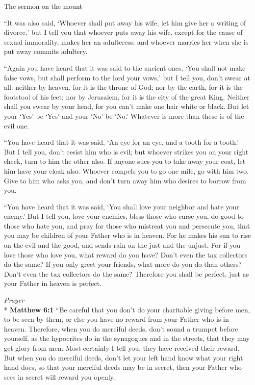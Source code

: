 \documentclass[10pt,a5paper,twoside]{article}
\newcommand{\quotesize}{\normalsize{}}
\newenvironment{quotetext}{\begingroup\quotesize}{\endgroup}
\newcommand{\intex}[1]{\index[texts]{#1}}
\newcommand{\bible}[2]{\begin{quotetext}\textbf{#1}\intex{#1} #2\end{quotetext}}
\newcommand{\matthew}[2]{\bible{Matthew #1}{#2}}
\newcommand{\subhead}[1]{\emph{#1}\\*}
\begin{document}
\begin{section}{The sermon on the mount}
{   ``It was also said, `Whoever shall put away his wife, let him give her a writing of divorce,'    but I tell you that whoever puts away his wife, except for the cause of sexual immorality, makes her an adulteress; and whoever marries her when she is put away commits adultery.

   ``Again you have heard that it was said to the ancient ones, `You shall not make false vows, but shall perform to the lord your vows,'    but I tell you, don't swear at all: neither by heaven, for it is the throne of God;    nor by the earth, for it is the footstool of his feet; nor by Jerusalem, for it is the city of the great King.    Neither shall you swear by your head, for you can't make one hair white or black.    But let your `Yes' be `Yes' and your `No' be `No.' Whatever is more than these is of the evil one.

   ``You have heard that it was said, `An eye for an eye, and a tooth for a tooth.'    But I tell you, don't resist him who is evil; but whoever strikes you on your right cheek, turn to him the other also.    If anyone sues you to take away your coat, let him have your cloak also.    Whoever compels you to go one mile, go with him two.    Give to him who asks you, and don't turn away him who desires to borrow from you.

   ``You have heard that it was said, `You shall love your neighbor  and hate your enemy.'    But I tell you, love your enemies, bless those who curse you, do good to those who hate you, and pray for those who mistreat you and persecute you,    that you may be children of your Father who is in heaven. For he makes his sun to rise on the evil and the good, and sends rain on the just and the unjust.    For if you love those who love you, what reward do you have? Don't even the tax collectors do the same?    If you only greet your friends, what more do you do than others? Don't even the tax collectors do the same?    Therefore you shall be perfect, just as your Father in heaven is perfect.
}

\subhead{Prayer}
\matthew{6:1}{
    ``Be careful that you don't do your charitable giving before men, to be seen by them, or else you have no reward from your Father who is in heaven.    Therefore, when you do merciful deeds, don't sound a trumpet before yourself, as the hypocrites do in the synagogues and in the streets, that they may get glory from men. Most certainly I tell you, they have received their reward.    But when you do merciful deeds, don't let your left hand know what your right hand does,    so that your merciful deeds may be in secret, then your Father who sees in secret will reward you openly.

}
\end{section}
\end{document}
